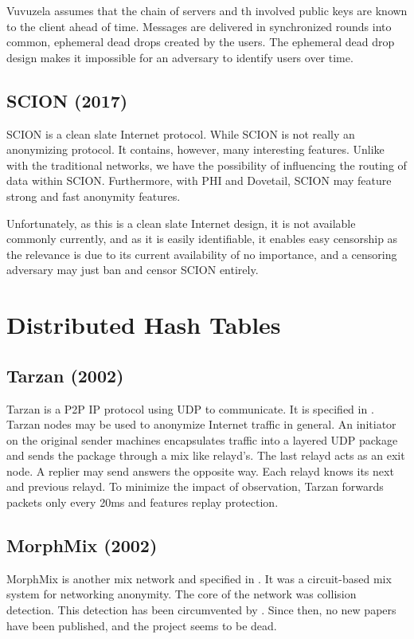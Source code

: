 Vuvuzela assumes that the chain of servers and th involved public keys are known to the client ahead of time. Messages are delivered in synchronized rounds into common, ephemeral dead drops created by the users. The ephemeral dead drop design makes it impossible for an adversary to identify users over time.

\subsection{SCION (2017)}
SCION\cite{perrig2017scion} is a clean slate Internet protocol. While SCION is not really an anonymizing protocol. It contains, however,  many interesting features. Unlike with the traditional networks, we have the possibility of influencing the routing of data within SCION. Furthermore, with PHI\cite{chen2017phi} and Dovetail\cite{sankey2014dovetail}, SCION may feature strong and fast anonymity features. 

Unfortunately, as this is a clean slate Internet design, it is not available commonly currently, and as it is easily identifiable, it enables easy censorship as the relevance is due to its current availability of no importance, and a censoring adversary may just ban and censor SCION entirely. 

\section{Distributed Hash Tables}
\subsection{Tarzan (2002)}
Tarzan is a P2P IP protocol using UDP to communicate. It is specified in \cite{tarzan:ccs02}. Tarzan nodes may be used to anonymize Internet traffic in general. An initiator on the original sender machines encapsulates traffic into a layered UDP package and sends the package through a mix like relayd's. The last relayd acts as an exit node. A replier may send answers the opposite way. Each relayd knows its next and previous relayd. To minimize the impact of observation, Tarzan forwards packets only every 20ms and features replay protection.

\subsection{MorphMix (2002)}
MorphMix is another mix network and specified in \cite{morphmix:wpes2002}. It was a circuit-based mix system for networking anonymity. The core of the network was collision detection. This detection has been circumvented by \cite{morphmix:pet2006}. Since then, no new papers have been published, and the project seems to be dead.

